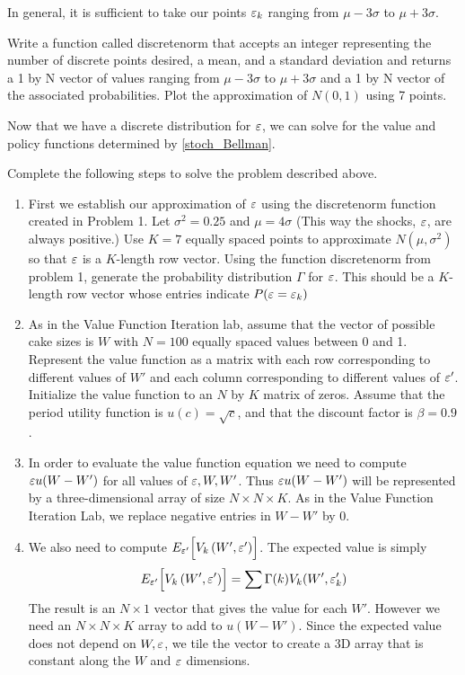 In general, it is sufficient to take our points $\varepsilon_k$ ranging from $\mu - 3\sigma$ to $\mu + 3\sigma$.

\begin{problem}
Write a function called discretenorm that accepts an integer representing the number of discrete points desired, a mean, and a standard deviation and returns a 1 by N vector of values ranging from $\mu - 3\sigma$ to $\mu + 3\sigma$  and a 1 by N vector of the associated probabilities.  Plot the approximation of $N(0,1)$ using 7 points.
\end{problem}

Now that we have a discrete distribution for $\varepsilon$, we can solve for the value and policy functions determined by \eqref{stoch_Bellman}.

\begin{problem}
Complete the following steps to solve the problem described above.
\begin{enumerate}
   \item First we establish our approximation of $\varepsilon$ using the discretenorm function created in Problem 1. Let $\sigma^2 = 0.25$ and $\mu=4\sigma$ (This way the shocks, $\varepsilon$, are always positive.) Use $K=7$ equally spaced points to approximate $N(\mu,\sigma^2)$ so that $\varepsilon$ is a $K$-length row vector.  Using the function discretenorm from problem 1, generate the probability distribution $\Gamma$ for $\varepsilon$. This should be a $K$-length row vector whose entries indicate $P(\varepsilon = \varepsilon_k)$

   \item As in the Value Function Iteration lab, assume that the vector of possible cake sizes is $W$ with $N=100$ equally spaced values between 0 and 1.  Represent the value function as a matrix with each row corresponding to different values of $W'$ and each column corresponding to different values of $\varepsilon'$. Initialize the value function to an $N$ by $K$ matrix of zeros.  Assume that the period utility function is $u(c)=\sqrt{c}$, and that the discount factor is $\beta = 0.9$.


   \item In order to evaluate the value function equation we need to compute $\varepsilon u(W-W')$ for all values of $\varepsilon,W,W'$.  Thus $\varepsilon u(W-W')$ will be represented by a three-dimensional array of size $N\times N\times K$.  As in the Value Function Iteration Lab, we replace negative entries in $W-W'$ by 0.

   \item We also need to compute $E_{\varepsilon'}\Bigl[V_k\left(W',\varepsilon'\right)\Bigr]$.  The expected value is simply
       \begin{equation*}
       E_{\varepsilon'}\Bigl[V_k\left(W',\varepsilon'\right)\Bigr] = \sum \Gamma(k)V_k(W',\varepsilon_k')
       \end{equation*}  The result is an $N\times 1$ vector that gives the value for each $W'$.  However we need an $N\times N\times K$ array to add to $u(W-W')$.  Since the expected value does not depend on $W,\varepsilon$, we tile the vector to create a 3D array that is constant along the $W$ and $\varepsilon$ dimensions.


\end{enumerate}
\end{problem}
